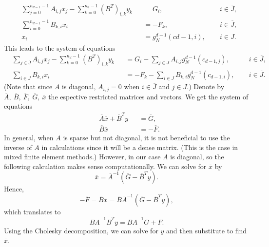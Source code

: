 \begin{discussion}
\begin{subequations}
\begin{alignat}{3}
      & \sum_{j = 0}^{n_{d - 1} - 1} A_{i, j} x_j
        - \sum_{k = 0}^{n_d - 1} (B^T)_{i, k} y_k
      && = G_i, \enspace
      && i \in \overline{J}, \\
%
      & \sum_{i = 0}^{n_{d - 1} - 1} B_{k, i} x_i
      && = - F_k, \enspace
      && i \in \overline{J}, \\
%
      & x_i
      && = g_N^{d - 1}(c{d - 1, i}), \enspace
      && i \in J.
    \end{alignat}
  \end{subequations}
  This leads to the system of equations
  \begin{subequations}
    \begin{alignat}{3}
      & \sum_{j \in \overline{J}} A_{i, j} x_j
        - \sum_{k = 0}^{n_d - 1} (B^T)_{i, k} y_k
      && = G_i - \sum_{j \in J} A_{i, j} g_N^{d - 1}(c_{d - 1, j}), \enspace
      && i \in \overline{J}, \\
%
      & \sum_{i \in J} B_{k, i} x_i
      && = - F_k - \sum_{i \in J} B_{k, i} g_N^{d - 1}(c_{d - 1, i}), \enspace
      && i \in \overline{J}.
    \end{alignat}
  \end{subequations}
  (Note that since $A$ is diagonal, $A_{i, j} = 0$ when $i \in \overline{J}$ and
  $j \in J$.)
  Denote by $\overline{A},\ \overline{B},\ \overline{F},\ \overline{G},\
  \overline{x}$ the espective restricted matrices and vectors.
  We get the system of equations
  \begin{subequations}
    \begin{alignat}{2}
      & \overline{A} \overline{x} + \overline{B}^T y
      && = \overline{G}, \\
%
      & \overline{B} \overline{x}
      && = - \overline{F}.
    \end{alignat}
  \end{subequations}
  In general, when $A$ is sparse but not diagonal, it is not beneficial to use
  the inverse of $A$ in calculations since it will be a dense matrix.
  (This is the case in mixed finite element methods.)
  However, in our case $A$ is diagonal, so the following calculation makes sense
  computationally.
  We can solve for $\overline{x}$ by
  \begin{equation}
    \overline{x} = \overline{A}^{-1} (\overline{G} - \overline{B}^T y).
  \end{equation}
  Hence,
  \begin{equation}
    - \overline{F}
    = \overline{B} \overline{x}
    = \overline{B} \overline{A}^{-1} (\overline{G} - \overline{B}^T y),
  \end{equation}
  which translates to
  \begin{equation}
    \overline{B} \overline{A}^{-1} \overline{B}^T y
    = \overline{B} \overline{A}^{-1} \overline{G} + \overline{F}.
  \end{equation}
  Using the Cholesky decomposition, we can solve for $y$ and then substitute to
  find $\overline{x}$.
\end{discussion}
